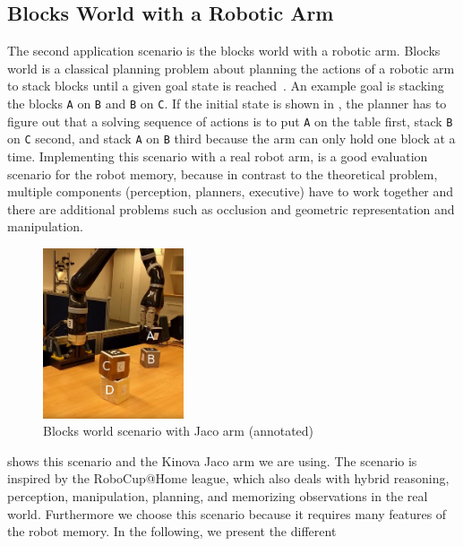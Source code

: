 \subsection{Blocks World with a Robotic Arm}
\label{sec:app-blocks-world}
The second application scenario is the blocks world with a robotic
arm. Blocks world is a classical planning problem about planning the
actions of a robotic arm to stack blocks until a given goal state is
reached~\cite{blocks-world}. An example goal is stacking the blocks \texttt{A} on
\texttt{B} and \texttt{B} on \texttt{C}. If the initial state is shown
in , the planner has to figure out that a solving sequence of
actions is to put \texttt{A} on the table first, stack \texttt{B} on
\texttt{C} second, and stack \texttt{A} on
\texttt{B} third because the arm can only hold one block at a time.
Implementing this scenario with a real robot arm, is a good evaluation
scenario for the robot memory, because in contrast to the theoretical
problem, multiple components (perception, planners, executive)
have to work together and there are additional problems such as
occlusion and geometric representation and manipulation.
\begin{figure}
  \centering
  \vspace{-6mm}
  \includegraphics[width=0.37\textwidth]{img/blocks-world-annotated}%
  \caption[Blocks world scenario with Jaco arm (annotated)]{Blocks world scenario with Jaco arm (annotated)}
  \vspace{-4mm}
  \label{fig:blocksworld}
\end{figure}
 shows this scenario and the Kinova Jaco arm
we are using. The scenario is inspired by the RoboCup@Home league,
which also deals with hybrid reasoning, perception, manipulation,
planning, and memorizing observations in the real world. Furthermore
we choose this scenario because it requires many features of
the robot memory. In the following, we present the different
